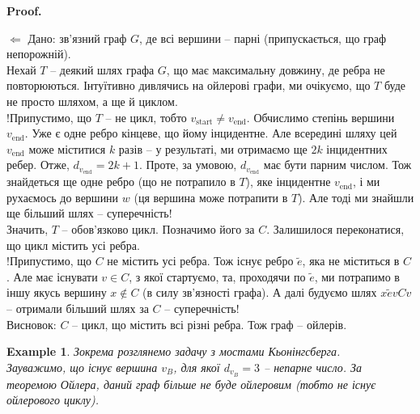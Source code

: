 \documentclass[a4paper, 14pt]{extarticle}
\makeatletter
\def\leftproof{$\boxed{\Leftarrow}$ }
\theoremstyle{theoremdd}
\theoremstyle{theoremdd}
\theoremstyle{theoremdd}
\theoremstyle{theoremdd}
\theoremstyle{theoremdd}
\newtheorem{example}[theorem]{Example}
\theoremstyle{theoremdd}
\theoremstyle{theoremdd}
\theoremstyle{theoremdd}
\theoremstyle{theoremdd}
\theoremstyle{theoremdd}
\theoremstyle{theoremdd}
\newtheorem{remark}[theorem]{Remark}
\theoremstyle{theoremdd}
\theoremstyle{theoremdd}
\theoremstyle{theoremdd}
\theoremstyle{theoremdd}
\renewenvironment{proof}[1][Proof.\\]{\par
\pushQED{\hfill \qed}%
\normalfont \topsep6\p@\@plus6\p@\relax
\trivlist
\item\relax
{\bfseries
#1\@addpunct{.}}\hspace\labelsep\ignorespaces
}{%
\popQED\endtrivlist\@endpefalse
}
\makeatother
\begin{document}
\begin{proof}
\leftproof Дано: зв'язний граф $G$, де всі вершини -- парні (припускається, що граф непорожній).\\
Нехай $T$ -- деякий шлях графа $G$, що має максимальну довжину, де ребра не повторюються. Інтуїтивно дивлячись на ойлерові графи, ми очікуємо, що $T$ буде не просто шляхом, а ще й циклом.\\
!Припустимо, що $T$ -- не цикл, тобто $v_{\text{start}} \neq v_{\text{end}}$. Обчислимо степінь вершини $v_{\text{end}}$. Уже є одне ребро кінцеве, що йому інцидентне. Але всередині шляху цей $v_{\text{end}}$ може міститися $k$ разів -- у результаті, ми отримаємо ще $2k$ інцидентних ребер. Отже, $d_{v_{\text{end}}} = 2k+1$. Проте, за умовою, $d_{v_{\text{end}}}$ має бути парним числом. Тож знайдеться ще одне ребро (що не потрапило в $T$), яке інцидентне $v_{\text{end}}$, і ми рухаємось до вершини $w$ (ця вершина може потрапити в $T$). Але тоді ми знайшли ще більший шлях -- суперечність!\\
Значить, $T$ -- обов'язково цикл. Позначимо його за $C$. Залишилося переконатися, що цикл містить усі ребра.\\
!Припустимо, що $C$ не містить усі ребра. Тож існує ребро $\tilde{e}$, яка не міститься в $C$. Але має існувати $v \in C$, з якої стартуємо, та, проходячи по $\tilde{e}$, ми потрапимо в іншу якусь вершину $x \notin C$ (в силу зв'язності графа). А далі будуємо шлях $x \tilde{e} v C v$ -- отримали більший шлях за $C$ -- суперечність!\\
Висновок: $C$ -- цикл, що містить всі різні ребра. Тож граф -- ойлерів.
\end{proof}

\begin{example}
Зокрема розглянемо задачу з мостами Кьонінгсберга.\\
Зауважимо, що існує вершина $v_B$, для якої $d_{v_B} = 3$ -- непарне число. За теоремою Ойлера, даний граф більше не буде ойлеровим (тобто не існує ойлерового циклу).
\end{example}
\end{document}
